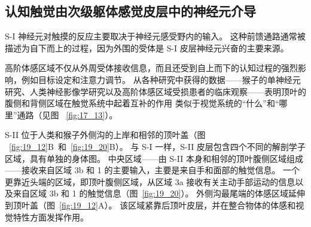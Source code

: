 \subsection{认知触觉由次级躯体感觉皮层中的神经元介导}

S-I 神经元对触摸的反应主要取决于神经元感受野内的输入。
这种前馈通路通常被描述为自下而上的过程，因为外围的受体是 S-I 皮层神经元兴奋的主要来源。


高阶体感区域不仅从外周受体接收信息，而且还受到自上而下的认知过程的强烈影响，例如目标设定和注意力调节。
从各种研究中获得的数据——猴子的单神经元研究、人类神经影像学研究以及高阶体感区域受损患者的临床观察——表明顶叶的腹侧和背侧区域在触觉系统中起着互补的作用 类似于视觉系统的“什么”和“哪里”通路（见图 ~\ref{fig:17_13}）。


S-II 位于人类和猴子外侧沟的上岸和相邻的顶叶盖（图 ~\ref{fig:19_12}B~和~\ref{fig:19_20}B）。 与 S-I 一样，S-II 皮层包含四个不同的解剖学子区域，具有单独的身体图。
中央区域——由 S-II 本身和相邻的顶叶腹侧区域组成——接收来自区域 3b 和 1 的主要输入，主要是来自手和面部的触觉信息。
一个更靠近头端的区域，即顶叶腹侧区域，从区域 3a 接收有关主动手部运动的信息以及来自区域 3b 和 1 的触觉信息（图~\ref{fig:19_20}）。
外侧沟最尾端的体感区域延伸到顶叶盖（图~\ref{fig:19_12}A）。
该区域紧靠后顶叶皮层，并在整合物体的体感和视觉特性方面发挥作用。


